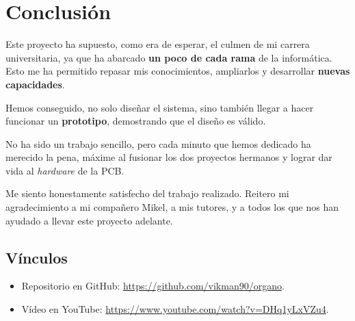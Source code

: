 \documentclass[10pt,a4paper]{article}
\begin{document}
		
	\section{Conclusión}
	
	Este proyecto ha supuesto, como era de esperar, el culmen de mi carrera universitaria, ya que ha abarcado \textbf{un poco de cada rama} de la informática. Esto me ha permitido repasar mis conocimientos, ampliarlos y desarrollar \textbf{nuevas capacidades}.
	
	Hemos conseguido, no solo diseñar el sistema, sino también llegar a hacer funcionar un \textbf{prototipo}, demostrando que el diseño es válido.
	
	No ha sido un trabajo sencillo, pero cada minuto que hemos dedicado ha merecido la pena, máxime al fusionar los dos proyectos hermanos y lograr dar vida al \textit{hardware} de la PCB. 
	
	Me siento honestamente satisfecho del trabajo realizado. Reitero mi agradecimiento a mi compañero Mikel, a mis tutores, y a todos los que nos han ayudado a llevar este proyecto adelante.
	
	\subsection{Vínculos}
	
	\begin{itemize}
		\item Repositorio en GitHub: \url{https://github.com/vikman90/organo}.
		\item Vídeo en YouTube: \url{https://www.youtube.com/watch?v=DHq1yLxVZu4}.
	\end{itemize}
\end{document}
